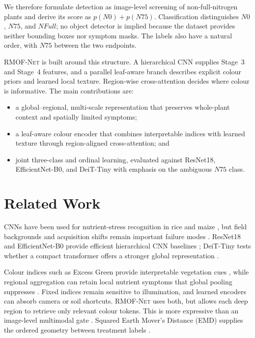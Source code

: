 \documentclass[conference]{IEEEtran}
\newcommand{\rmofnet}{\textsc{RMOF-Net}\xspace}
\begin{document}
We therefore formulate detection as image-level screening of non-full-nitrogen plants and derive its score as $p(N0)+p(N75)$. Classification distinguishes $N0$, $N75$, and $NFull$; no object detector is implied because the dataset provides neither bounding boxes nor symptom masks. The labels also have a natural order, with $N75$ between the two endpoints.

\rmofnet is built around this structure. A hierarchical CNN supplies Stage~3 and Stage~4 features, and a parallel leaf-aware branch describes explicit colour priors and learned local texture. Region-wise cross-attention decides where colour is informative. The main contributions are:
\begin{itemize}
  \item a global--regional, multi-scale representation that preserves whole-plant context and spatially limited symptoms;
  \item a leaf-aware colour encoder that combines interpretable indices with learned texture through region-aligned cross-attention; and
  \item joint three-class and ordinal learning, evaluated against ResNet18, EfficientNet-B0, and DeiT-Tiny with emphasis on the ambiguous $N75$ class.
\end{itemize}

\section{Related Work}
CNNs have been used for nutrient-stress recognition in rice and maize \cite{sethy2020rice,salaic2023dataset}, but field backgrounds and acquisition shifts remain important failure modes \cite{mohanty2016plant,singh2020plantdoc,yi2024mvmatch}. ResNet18 and EfficientNet-B0 provide efficient hierarchical CNN baselines \cite{he2016resnet,tan2019efficientnet}; DeiT-Tiny tests whether a compact transformer offers a stronger global representation \cite{touvron2021deit}.

Colour indices such as Excess Green provide interpretable vegetation cues \cite{woebbecke1995color,meyer2008excessgreen}, while regional aggregation can retain local nutrient symptoms that global pooling suppresses \cite{bera2024pndnet}. Fixed indices remain sensitive to illumination, and learned encoders can absorb camera or soil shortcuts. \rmofnet uses both, but allows each deep region to retrieve only relevant colour tokens. This is more expressive than an image-level multimodal gate \cite{arevalo2017gmu}. Squared Earth Mover's Distance (EMD) supplies the ordered geometry between treatment labels \cite{hou2016emd}.
\end{document}
